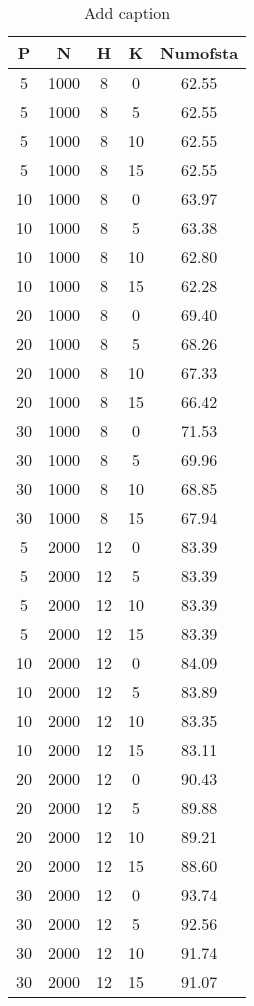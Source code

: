 \begin{table}[htbp]
  \centering
  \caption{Add caption}
    \begin{tabular}{ccccc}
    \toprule
    P     & N     & H     & K     & Numofsta \\
    \midrule
    5     & 1000  & 8     & 0     & 62.55  \\
    5     & 1000  & 8     & 5     & 62.55  \\
    5     & 1000  & 8     & 10    & 62.55  \\
    5     & 1000  & 8     & 15    & 62.55  \\
    10    & 1000  & 8     & 0     & 63.97  \\
    10    & 1000  & 8     & 5     & 63.38  \\
    10    & 1000  & 8     & 10    & 62.80  \\
    10    & 1000  & 8     & 15    & 62.28  \\
    20    & 1000  & 8     & 0     & 69.40  \\
    20    & 1000  & 8     & 5     & 68.26  \\
    20    & 1000  & 8     & 10    & 67.33  \\
    20    & 1000  & 8     & 15    & 66.42  \\
    30    & 1000  & 8     & 0     & 71.53  \\
    30    & 1000  & 8     & 5     & 69.96  \\
    30    & 1000  & 8     & 10    & 68.85  \\
    30    & 1000  & 8     & 15    & 67.94  \\
    5     & 2000  & 12    & 0     & 83.39  \\
    5     & 2000  & 12    & 5     & 83.39  \\
    5     & 2000  & 12    & 10    & 83.39  \\
    5     & 2000  & 12    & 15    & 83.39  \\
    10    & 2000  & 12    & 0     & 84.09  \\
    10    & 2000  & 12    & 5     & 83.89  \\
    10    & 2000  & 12    & 10    & 83.35  \\
    10    & 2000  & 12    & 15    & 83.11  \\
    20    & 2000  & 12    & 0     & 90.43  \\
    20    & 2000  & 12    & 5     & 89.88  \\
    20    & 2000  & 12    & 10    & 89.21  \\
    20    & 2000  & 12    & 15    & 88.60  \\
    30    & 2000  & 12    & 0     & 93.74  \\
    30    & 2000  & 12    & 5     & 92.56  \\
    30    & 2000  & 12    & 10    & 91.74  \\
    30    & 2000  & 12    & 15    & 91.07  \\
    \bottomrule
    \end{tabular}%
  \label{tab:addlabel}%
\end{table}%
